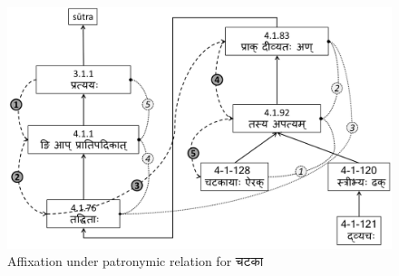 \documentclass[11pt]{article}
\begin{document}
     
\begin{figure}[h] 
    \centering
	\includegraphics[width=\textwidth]{tadrule2}
    \caption{Affixation under patronymic relation for {\skt चटका}}
    \label{fig:tadrule}
\end{figure}
  
  
  
  
\\
\end{document}
